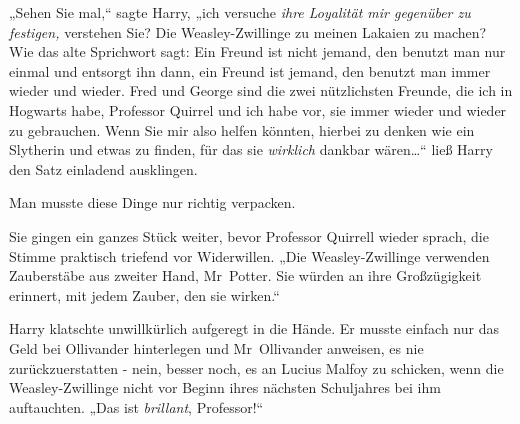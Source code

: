 „Sehen Sie mal,“ sagte Harry, „ich versuche \emph{ihre Loyalität mir gegenüber zu festigen,} verstehen Sie? Die Weasley-Zwillinge zu meinen Lakaien zu machen? Wie das alte Sprichwort sagt: Ein Freund ist nicht jemand, den benutzt man nur einmal und entsorgt ihn dann, ein Freund ist jemand, den benutzt man immer wieder und wieder. Fred und George sind die zwei nützlichsten Freunde, die ich in Hogwarts habe, Professor Quirrel und ich habe vor, sie immer wieder und wieder zu gebrauchen. Wenn Sie mir also helfen könnten, hierbei zu denken wie ein Slytherin und etwas zu finden, für das sie \emph{wirklich} dankbar wären…“ ließ Harry den Satz einladend ausklingen.

Man musste diese Dinge nur richtig verpacken.

Sie gingen ein ganzes Stück weiter, bevor Professor Quirrell wieder sprach, die Stimme praktisch triefend vor Widerwillen. „Die Weasley-Zwillinge verwenden Zauberstäbe aus zweiter Hand, Mr~Potter. Sie würden an ihre Großzügigkeit erinnert, mit jedem Zauber, den sie wirken.“

Harry klatschte unwillkürlich aufgeregt in die Hände. Er musste einfach nur das Geld bei Ollivander hinterlegen und Mr~Ollivander anweisen, es nie zurückzuerstatten - nein, besser noch, es an Lucius Malfoy zu schicken, wenn die Weasley-Zwillinge nicht vor Beginn ihres nächsten Schuljahres bei ihm auftauchten. „Das ist \emph{brillant}, Professor!“

